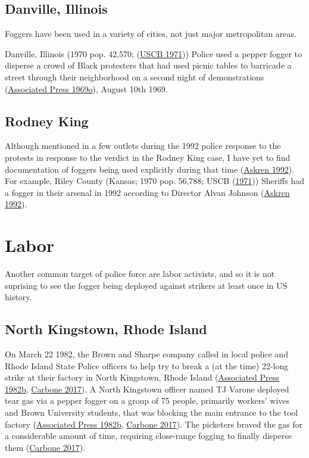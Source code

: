 \documentclass[
  11pt,
]{krantz}
\begin{document}
\hypertarget{danville-illinois}{%
\subsection{Danville, Illinois}\label{danville-illinois}}

Foggers have been used in a variety of cities, not just major metropolitan areas.

Danville, Illinois (1970 pop. 42,570; (\protect\hyperlink{ref-USCB1970}{USCB 1971})) Police used a pepper fogger to disperse a crowd of Black protesters that had used picnic tables to barricade a street through their neighborhood on a second night of demonstrations (\protect\hyperlink{ref-Palladium-Item1969}{Associated Press 1969o}), August 10th 1969.

\hypertarget{rodney-king}{%
\subsection{Rodney King}\label{rodney-king}}

Although mentioned in a few outlets during the 1992 police response to the protests in response to the verdict in the Rodney King case, I have yet to find documentation of foggers being used explicitly during that time (\protect\hyperlink{ref-Askren1992}{Askren 1992}).
For example, Riley County (Kansas; 1970 pop. 56,788; USCB (\protect\hyperlink{ref-USCB1970}{1971})) Sheriffs had a fogger in their arsenal in 1992 according to Director Alvan Johnson (\protect\hyperlink{ref-Askren1992}{Askren 1992}).

\hypertarget{labor}{%
\section{Labor}\label{labor}}

Another common target of police force are labor activists, and so it is not suprising to see the fogger being deployed against strikers at least once in US history.

\hypertarget{north-kingstown-rhode-island}{%
\subsection{North Kingstown, Rhode Island}\label{north-kingstown-rhode-island}}

On March 22 1982, the Brown and Sharpe company called in local police and Rhode Island State Police officers to help try to break a (at the time) 22-long strike at their factory in North Kingstown, Rhode Island (\protect\hyperlink{ref-TheLexingtonHerald1982_03_23}{Associated Press 1982b}, \protect\hyperlink{ref-Carbone2017}{Carbone 2017}).
A North Kingstown officer named TJ Varone deployed tear gas via a pepper fogger on a group of 75 people, primarily workers' wives and Brown University students, that was blocking the main entrance to the tool factory (\protect\hyperlink{ref-TheLexingtonHerald1982_03_23}{Associated Press 1982b}, \protect\hyperlink{ref-Carbone2017}{Carbone 2017}).
The picketers braved the gas for a considerable amount of time, requiring close-range fogging to finally disperse them (\protect\hyperlink{ref-Carbone2017}{Carbone 2017}).
\end{document}
